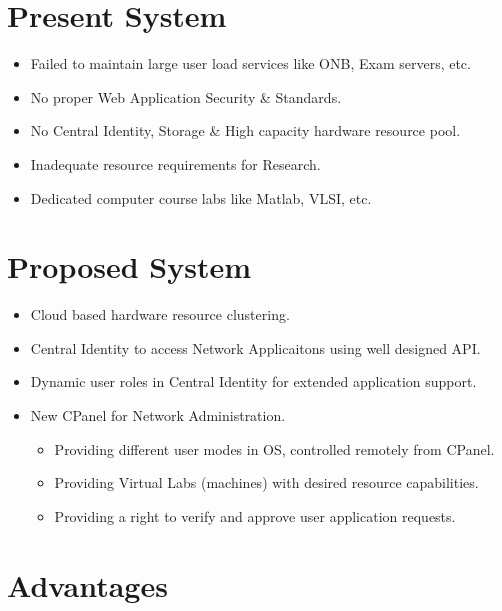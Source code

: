 \documentclass[]{article}
\begin{document}
\section*{Present System}
\begin{itemize}
	\item Failed to maintain large user load services like ONB, Exam servers, etc.
	\item No proper Web Application Security \& Standards.
	\item No Central Identity, Storage \& High capacity hardware resource pool.
	\item Inadequate resource requirements for Research.
	\item Dedicated computer course labs like Matlab, VLSI, etc. 
\end{itemize}

\section*{Proposed System}
\begin{itemize}
	\item Cloud based hardware resource clustering.
	\item Central Identity to access Network Applicaitons using well designed API.
	\item Dynamic user roles in Central Identity for extended application support.
	\item New CPanel for Network Administration.
		\begin{itemize}
			\item Providing different user modes in OS, controlled remotely from CPanel.
			\item Providing Virtual Labs (machines) with desired resource capabilities.
			\item Providing a right to verify and approve user application requests.
		\end{itemize}
\end{itemize}


\pagebreak

\section*{Advantages}
\end{document}
